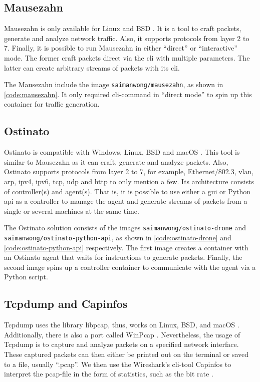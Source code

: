 \clearpage
\subsection{Mausezahn}
Mausezahn is only available for Linux and BSD \cite{netsniff7:online, UbuntuMa4:online}.
It is a tool to craft packets, generate and analyze network traffic.
Also, it supports protocols from layer 2 to 7.
Finally, it is possible to run Mausezahn in either ``direct'' or ``interactive'' mode.
The former craft packets direct via the \gls{cli} with multiple parameters.
The latter can create arbitrary streams of packets with its \gls{cli}.

\skippara The Mausezahn include the image \texttt{saimanwong/mausezahn}, as shown in \cref{code:mausezahn}.
It only required \gls{cli}-command in ``direct mode'' to spin up this container for traffic generation.


\subsection{Ostinato}
Ostinato is compatible with Windows, Linux, BSD and macOS \cite{Ostinato63:online, pstavirs92:online}.
This tool is similar to Mausezahn as it can craft, generate and analyze packets.
Also, Ostinato supports protocols from layer 2 to 7, for example, Ethernet/802.3, \acrshort{vlan}, \acrshort{arp}, \acrshort{ipv4}, \acrshort{ipv6}, \acrshort{tcp}, \acrshort{udp} and \acrshort{http} to only mention a few.
Its architecture consists of controller(s) and agent(s).
That is, it is possible to use either a \acrshort{gui} or Python \gls{api} as a controller to manage the agent and generate streams of packets from a single or several machines at the same time.

\skippara The Ostinato solution consists of the images \texttt{saimanwong/ostinato-drone} and \texttt{saimanwong/ostinato-python-api}, as shown in \cref{code:ostinato-drone} and \cref{code:ostinato-python-api} respectively.
The first image creates a container with an Ostinato agent that waits for instructions to generate packets.
Finally, the second image spins up a controller container to communicate with the agent via a Python script.

\subsection{Tcpdump and Capinfos}
Tcpdump uses the library libpcap, thus, works on Linux, BSD, and macOS \cite{TCPDUMPL66:online}.
Additionally, there is also a port called WinPcap \cite{WinPcapH61:online}.
Nevertheless, the usage of Tcpdump is to capture and analyze packets on a specified network interface.
These captured packets can then either be printed out on the terminal or saved to a file, usually ``.pcap''.
We then use the Wireshark's \gls{cli}-tool Capinfos to interpret the pcap-file in the form of statistics, such as the bit rate \cite{ToolsThe22:online}.

